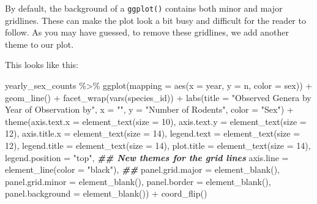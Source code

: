 \documentclass[
]{article}
\newenvironment{Shaded}{\begin{snugshade}}{\end{snugshade}}
\newcommand{\AttributeTok}[1]{\textcolor[rgb]{0.77,0.63,0.00}{#1}}
\newcommand{\DecValTok}[1]{\textcolor[rgb]{0.00,0.00,0.81}{#1}}
\newcommand{\DocumentationTok}[1]{\textcolor[rgb]{0.56,0.35,0.01}{\textbf{\textit{#1}}}}
\newcommand{\FunctionTok}[1]{\textcolor[rgb]{0.00,0.00,0.00}{#1}}
\newcommand{\NormalTok}[1]{#1}
\newcommand{\SpecialCharTok}[1]{\textcolor[rgb]{0.00,0.00,0.00}{#1}}
\newcommand{\StringTok}[1]{\textcolor[rgb]{0.31,0.60,0.02}{#1}}
\begin{document}
By default, the background of a \texttt{ggplot()} contains both minor
and major gridlines. These can make the plot look a bit busy and
difficult for the reader to follow. As you may have guessed, to remove
these gridlines, we add another theme to our plot.

This looks like this:

\begin{Shaded}
\begin{Highlighting}[]
\NormalTok{yearly\_sex\_counts }\SpecialCharTok{\%\textgreater{}\%} 
  \FunctionTok{ggplot}\NormalTok{(}\AttributeTok{mapping =} \FunctionTok{aes}\NormalTok{(}\AttributeTok{x =}\NormalTok{ year, }\AttributeTok{y =}\NormalTok{ n, }\AttributeTok{color =}\NormalTok{ sex)) }\SpecialCharTok{+}
  \FunctionTok{geom\_line}\NormalTok{() }\SpecialCharTok{+}
  \FunctionTok{facet\_wrap}\NormalTok{(}\FunctionTok{vars}\NormalTok{(species\_id)) }\SpecialCharTok{+}
  \FunctionTok{labs}\NormalTok{(}\AttributeTok{title =} \StringTok{"Observed Genera by Year of Observation by"}\NormalTok{,}
       \AttributeTok{x =} \StringTok{""}\NormalTok{,}
       \AttributeTok{y =} \StringTok{"Number of Rodents"}\NormalTok{, }
       \AttributeTok{color =} \StringTok{"Sex"}\NormalTok{) }\SpecialCharTok{+}
  \FunctionTok{theme}\NormalTok{(}\AttributeTok{axis.text.x =} \FunctionTok{element\_text}\NormalTok{(}\AttributeTok{size =} \DecValTok{10}\NormalTok{), }
        \AttributeTok{axis.text.y =} \FunctionTok{element\_text}\NormalTok{(}\AttributeTok{size =} \DecValTok{12}\NormalTok{), }
        \AttributeTok{axis.title.x =} \FunctionTok{element\_text}\NormalTok{(}\AttributeTok{size =} \DecValTok{14}\NormalTok{),}
        \AttributeTok{legend.text =} \FunctionTok{element\_text}\NormalTok{(}\AttributeTok{size =} \DecValTok{12}\NormalTok{),}
        \AttributeTok{legend.title =} \FunctionTok{element\_text}\NormalTok{(}\AttributeTok{size =} \DecValTok{14}\NormalTok{),}
        \AttributeTok{plot.title =} \FunctionTok{element\_text}\NormalTok{(}\AttributeTok{size =} \DecValTok{14}\NormalTok{), }
        \AttributeTok{legend.position =} \StringTok{"top"}\NormalTok{, }
        \DocumentationTok{\#\# New themes for the grid lines}
        \AttributeTok{axis.line =} \FunctionTok{element\_line}\NormalTok{(}\AttributeTok{color =} \StringTok{"black"}\NormalTok{),}
        \DocumentationTok{\#\# }
        \AttributeTok{panel.grid.major =} \FunctionTok{element\_blank}\NormalTok{(),}
        \AttributeTok{panel.grid.minor =} \FunctionTok{element\_blank}\NormalTok{(),}
        \AttributeTok{panel.border =} \FunctionTok{element\_blank}\NormalTok{(), }
        \AttributeTok{panel.background =} \FunctionTok{element\_blank}\NormalTok{()) }\SpecialCharTok{+} 
  \FunctionTok{coord\_flip}\NormalTok{()}
\end{Highlighting}
\end{Shaded}
\end{document}
